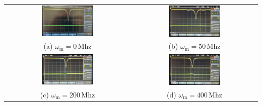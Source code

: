 \begin{center}
    \captionsetup{type=figure}
    \begin{tabular}{c c}
        \includegraphics[width=0.42\textwidth]{Bilder/Modulationsindex/mindex_0.jpg} 
        & \includegraphics[width=0.42\textwidth]{Bilder/Modulationsindex/mindex_50.jpg}   \\
        (a) $\omega_\mathrm{m} = 0$\,Mhz & (b) $\omega_\mathrm{m} = 50$\,Mhz \\[0,3cm]
        \includegraphics[width=0.42\textwidth]{Bilder/Modulationsindex/mindex_200.jpg} 
        & \includegraphics[width=0.42\textwidth]{Bilder/Modulationsindex/mindex_400.jpg}  \\
        (c) $\omega_\mathrm{m} = 200$\,Mhz & (d) $\omega_\mathrm{m} = 400$\,Mhz \\
    \end{tabular}
    \label{fig:mindex1}
\end{center}

\newpage

